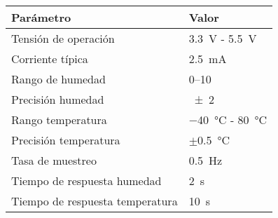 	\begin{tabular}{ll}
	\toprule
	\textbf{Parámetro} & \textbf{Valor} \\
	\midrule
	Tensión de operación & \SI{3.3}{\volt} - \SI{5.5}{\volt} \\
	Corriente típica & \SI{2.5}{\milli\ampere} \\
	Rango de humedad & \SIrange{0}{10}{\RH} \\
	Precisión humedad & \SI{\pm2}{\RH} \\
	Rango temperatura & \SI{-40}{\celsius} - \SI{80}{\celsius} \\
	Precisión temperatura & $\pm$\SI{0.5}{\celsius} \\
	Tasa de muestreo & \SI{0.5}{\hertz} \\
	Tiempo de respuesta humedad & \SI{2}{\second} \\
	Tiempo de respuesta temperatura & \SI{10}{\second} \\
	\bottomrule
\end{tabular}
